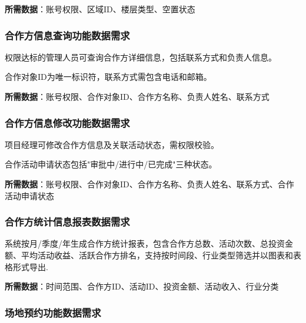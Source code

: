 \documentclass[]{article}
\begin{document}
\textbf{所需数据}：账号权限、区域ID、楼层类型、空置状态

\hypertarget{ux5408ux4f5cux65b9ux4fe1ux606fux67e5ux8be2ux529fux80fdux6570ux636eux9700ux6c42}{%
  \subsubsection{合作方信息查询功能数据需求}\label{ux5408ux4f5cux65b9ux4fe1ux606fux67e5ux8be2ux529fux80fdux6570ux636eux9700ux6c42}}

权限达标的管理人员可查询合作方详细信息，包括联系方式和负责人信息。

合作对象ID为唯一标识符，联系方式需包含电话和邮箱。

\textbf{所需数据}：账号权限、合作对象ID、合作方名称、负责人姓名、联系方式

\hypertarget{ux5408ux4f5cux65b9ux4fe1ux606fux4feeux6539ux529fux80fdux6570ux636eux9700ux6c42}{%
  \subsubsection{合作方信息修改功能数据需求}\label{ux5408ux4f5cux65b9ux4fe1ux606fux4feeux6539ux529fux80fdux6570ux636eux9700ux6c42}}

项目经理可修改合作方信息及关联活动状态，需权限校验。

合作活动申请状态包括"审批中/进行中/已完成"三种状态。

\textbf{所需数据}：账号权限、合作对象ID、合作方名称、负责人姓名、联系方式、合作活动申请状态

\hypertarget{ux5408ux4f5cux65b9ux7edfux8ba1ux4fe1ux606fux62a5ux8868ux6570ux636eux9700ux6c42}{%
  \subsubsection{合作方统计信息报表数据需求}\label{ux5408ux4f5cux65b9ux7edfux8ba1ux4fe1ux606fux62a5ux8868ux6570ux636eux9700ux6c42}}

系统按月/季度/年生成合作方统计报表，包含合作方总数、活动次数、总投资金额、平均活动收益、活跃合作方排名，支持按时间段、行业类型筛选并以图表和表格形式导出.

\textbf{所需数据}：时间范围、合作方ID、活动ID、投资金额、活动收入、行业分类

\hypertarget{ux573aux5730ux9884ux7ea6ux529fux80fdux6570ux636eux9700ux6c42}{%
  \subsubsection{场地预约功能数据需求}\label{ux573aux5730ux9884ux7ea6ux529fux80fdux6570ux636eux9700ux6c42}}
\end{document}
